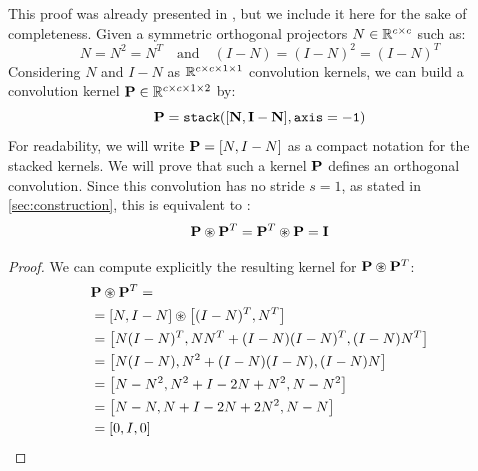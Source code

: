         This proof was already presented in \cite{li_preventing_2019}, but we include it here for the sake of completeness. %
        Given a symmetric orthogonal projectors $N\in\mathbb{R}^{c\times c}$  such as:
        \[
            N = N^2 = N^T \quad \text{and} \quad (I - N) = (I - N)^2 = (I - N)^T
        \]
        Considering $N$ and $I-N$ as $\mathbb{R}^{c\times c\times 1\times 1}$ convolution kernels, 
        we can build a  convolution kernel  $\mathbf{P}\in\mathbb{R}^{c\times c\times 1\times 2}$  by: 
        \[
        \mathbf{P} = \mathtt{stack(}[\mathbf{N}, \mathbf{I - N}]\mathtt{, axis=-1)}        
        \]
        For readability, we will write $\mathbf{P} = \left[ N , I-N \right]$ as a compact notation for the stacked kernels. We will prove that such a kernel $\mathbf{P}$ defines an  orthogonal convolution. Since this convolution has no stride $s=1$, as stated in  \cref{sec:construction}, this is equivalent to :
        \[
        \mathbf{P} \circledast \mathbf{P}^T = \mathbf{P}^T \circledast \mathbf{P} = \mathbf{I} 
        \]

    \begin{proof}

        We can  compute explicitly the resulting kernel for $\mathbf{P} \circledast \mathbf{P}^T$:
        \begin{align*}
            & \mathbf{P} \circledast \mathbf{P}^T =\\
            & = \left[ N , I-N \right] \circledast \left[ (I-N)^T , N^T \right] \\
            & = \left[ N(I-N)^T , NN^T + (I-N)(I-N)^T, (I-N)N^T  \right] \\
            & = \left[ N(I-N) , N^2 + (I-N)(I-N), (I-N)N  \right] \\
            & = \left[ N-N^2 , N^2 + I - 2N + N^2, N-N^2  \right] \\
            & = \left[ N-N , N + I - 2N + 2N^2, N-N  \right] \\
            & = \left[ 0, I, 0  \right] \\
        \end{align*}
    \end{proof}

